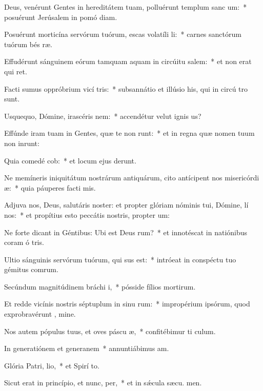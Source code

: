 \item Deus, venérunt Gentes in hereditátem tuam, polluérunt templum sanc um:~* posuérunt Jerúsalem in pomó diam.
\item Posuérunt morticína servórum tuórum, escas volatíli li:~* carnes sanctórum tuórum bés ræ.
\item Effudérunt sánguinem eórum tamquam aquam in circúitu salem:~* et non erat qui ret.
\item Facti sumus oppróbrium vicí tris:~* subsannátio et illúsio his, qui in circú tro sunt.
\item Usquequo, Dómine, irascéris  nem:~* accendétur velut ignis  us?
\item Effúnde iram tuam in Gentes, quæ te non runt:~* et in regna quæ nomen tuum non inrunt:
\item Quia comedé cob:~* et locum ejus derunt.
\item Ne memíneris iniquitátum nostrárum antiquárum, cito antícipent nos misericórdi æ:~* quia páuperes facti  mis.
\item Adjuva nos, Deus, salutáris noster: et propter glóriam nóminis tui, Dómine, lí nos:~* et propítius esto peccátis nostris, propter  um:
\item Ne forte dicant in Géntibus: Ubi est Deus rum?~* et innotéscat in natiónibus coram ó tris.
\item Ultio sánguinis servórum tuórum, qui sus est:~* intróeat in conspéctu tuo gémitus comrum.
\item Secúndum magnitúdinem bráchi i,~* pósside fílios mortirum.
\item Et redde vicínis nostris séptuplum in sinu rum:~* impropérium ipsórum, quod exprobravérunt , mine.
\item Nos autem pópulus tuus, et oves páscu æ,~* confitébimur ti  culum.
\item In generatiónem et generanem~* annuntiábimus  am.
\item Glória Patri,  lio,~* et Spirí to.
\item Sicut erat in princípio, et nunc,  per,~* et in sǽcula sæcu. men.
